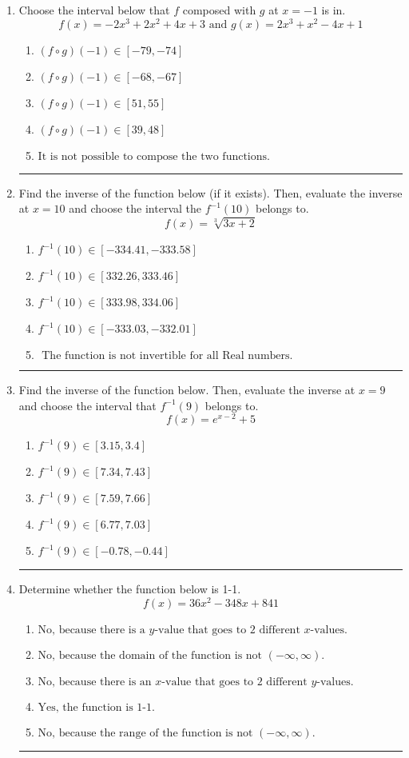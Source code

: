 \documentclass[14pt]{extbook}
\newcommand{\litem}[1]{\item#1\hspace*{-1cm}\rule{\textwidth}{0.4pt}}
\begin{document}
\begin{enumerate}
{\begin{enumerate}[label=\Alph*.]
\end{enumerate} }
\litem{
Choose the interval below that $f$ composed with $g$ at $x=-1$ is in.\[ f(x) = -2x^{3} +2 x^{2} +4 x + 3 \text{ and } g(x) = 2x^{3} + x^{2} -4 x + 1 \]\begin{enumerate}[label=\Alph*.]
\item \( (f \circ g)(-1) \in [-79, -74] \)
\item \( (f \circ g)(-1) \in [-68, -67] \)
\item \( (f \circ g)(-1) \in [51, 55] \)
\item \( (f \circ g)(-1) \in [39, 48] \)
\item \( \text{It is not possible to compose the two functions.} \)

\end{enumerate} }
\litem{
Find the inverse of the function below (if it exists). Then, evaluate the inverse at $x = 10$ and choose the interval the $f^{-1}(10)$ belongs to.\[ f(x) = \sqrt[3]{3 x + 2} \]\begin{enumerate}[label=\Alph*.]
\item \( f^{-1}(10) \in [-334.41, -333.58] \)
\item \( f^{-1}(10) \in [332.26, 333.46] \)
\item \( f^{-1}(10) \in [333.98, 334.06] \)
\item \( f^{-1}(10) \in [-333.03, -332.01] \)
\item \( \text{ The function is not invertible for all Real numbers. } \)

\end{enumerate} }
\litem{
Find the inverse of the function below. Then, evaluate the inverse at $x = 9$ and choose the interval that $f^{-1}(9)$ belongs to.\[ f(x) = e^{x-2}+5 \]\begin{enumerate}[label=\Alph*.]
\item \( f^{-1}(9) \in [3.15, 3.4] \)
\item \( f^{-1}(9) \in [7.34, 7.43] \)
\item \( f^{-1}(9) \in [7.59, 7.66] \)
\item \( f^{-1}(9) \in [6.77, 7.03] \)
\item \( f^{-1}(9) \in [-0.78, -0.44] \)

\end{enumerate} }
\litem{
Determine whether the function below is 1-1.\[ f(x) = 36 x^2 - 348 x + 841 \]\begin{enumerate}[label=\Alph*.]
\item \( \text{No, because there is a $y$-value that goes to 2 different $x$-values.} \)
\item \( \text{No, because the domain of the function is not $(-\infty, \infty)$.} \)
\item \( \text{No, because there is an $x$-value that goes to 2 different $y$-values.} \)
\item \( \text{Yes, the function is 1-1.} \)
\item \( \text{No, because the range of the function is not $(-\infty, \infty)$.} \)

\end{enumerate} }
\end{enumerate}
\end{document}
